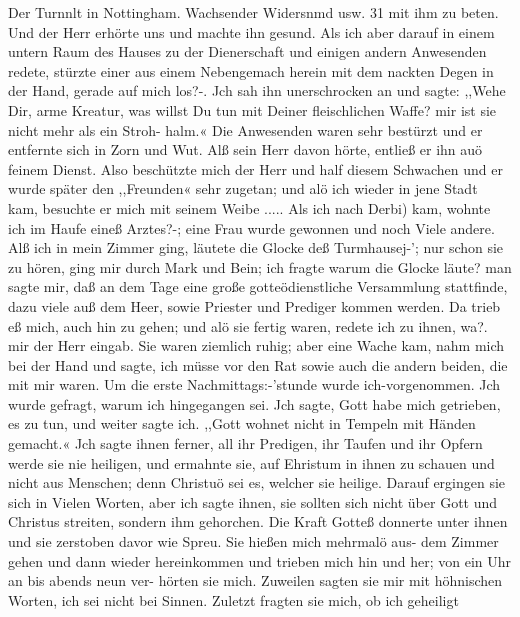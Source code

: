 Der Turnnlt in Nottingham. Wachsender Widersnmd usw. 31
mit ihm zu beten. Und der Herr erhörte uns und machte ihn
gesund. Als ich aber darauf in einem untern Raum des Hauses
zu der Dienerschaft und einigen andern Anwesenden redete, stürzte
einer aus einem Nebengemach herein mit dem nackten Degen in
der Hand, gerade auf mich los?-. Jch sah ihn unerschrocken an
und sagte: ,,Wehe Dir, arme Kreatur, was willst Du tun mit
Deiner fleischlichen Waffe? mir ist sie nicht mehr als ein Stroh-
halm.« Die Anwesenden waren sehr bestürzt und er entfernte
sich in Zorn und Wut. Alß sein Herr davon hörte, entließ er
ihn auö feinem Dienst. Also beschützte mich der Herr und half
diesem Schwachen und er wurde später den ,,Freunden« sehr
zugetan; und alö ich wieder in jene Stadt kam, besuchte er mich
mit seinem Weibe .....
Als ich nach Derbi) kam, wohnte ich im Haufe eineß Arztes?-;
eine Frau wurde gewonnen und noch Viele andere. Alß ich in
mein Zimmer ging, läutete die Glocke deß Turmhausej-’; nur schon
sie zu hören, ging mir durch Mark und Bein; ich fragte warum
die Glocke läute? man sagte mir, daß an dem Tage eine große
gotteödienstliche Versammlung stattfinde, dazu viele auß dem
Heer, sowie Priester und Prediger kommen werden. Da trieb
eß mich, auch hin zu gehen; und alö sie fertig waren, redete ich
zu ihnen, wa?. mir der Herr eingab. Sie waren ziemlich ruhig;
aber eine Wache kam, nahm mich bei der Hand und sagte, ich
müsse vor den Rat sowie auch die andern beiden, die mit mir
waren. Um die erste Nachmittags:-’stunde wurde ich-vorgenommen.
Jch wurde gefragt, warum ich hingegangen sei. Jch sagte, Gott
habe mich getrieben, es zu tun, und weiter sagte ich. ,,Gott
wohnet nicht in Tempeln mit Händen gemacht.« Jch sagte ihnen
ferner, all ihr Predigen, ihr Taufen und ihr Opfern werde sie
nie heiligen, und ermahnte sie, auf Ehristum in ihnen zu schauen
und nicht aus Menschen; denn Christuö sei es, welcher sie heilige.
Darauf ergingen sie sich in Vielen Worten, aber ich sagte ihnen,
sie sollten sich nicht über Gott und Christus streiten, sondern
ihm gehorchen. Die Kraft Gotteß donnerte unter ihnen und
sie zerstoben davor wie Spreu. Sie hießen mich mehrmalö
aus- dem Zimmer gehen und dann wieder hereinkommen und
trieben mich hin und her; von ein Uhr an bis abends neun ver-
hörten sie mich. Zuweilen sagten sie mir mit höhnischen Worten,
ich sei nicht bei Sinnen. Zuletzt fragten sie mich, ob ich geheiligt


